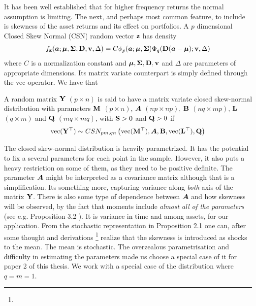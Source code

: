 \documentclass[]{book}\usepackage{knitr}
\begin{document}
It has been well established that for higher frequency returns the normal assumption is limiting. 
The next, and perhaps most common feature, to include is skewness of the asset returns and its effect on portfolios. 
A $p$ dimensional Closed Skew Normal (CSN) random vector $\mathbf{z}$ has density
\begin{equation}
  f_{\mathbf{z}}(\mbox{\boldmath$a$}; \mbox{\boldmath$\mu$}, \mathbf{\Sigma}, \mathbf{D}, \mathbf{v}, \Delta) = C \phi_p(\mbox{\boldmath$a$}; \mbox{\boldmath$\mu$}, \mathbf{\Sigma}) \Phi_q(\mathbf{D}(\mbox{\boldmath$a$}-\mbox{\boldmath$\mu$}); \mathbf{v}, \Delta)
\end{equation}
where $C$ is a normalization constant and $\mbox{\boldmath$\mu$}, \mathbf{\Sigma}, \mathbf{D}, \mathbf{v}$ and $\Delta$ are parameters of appropriate dimensions. Its matrix variate counterpart is simply defined through the vec operator. We have that
\begin{definition}
  A random matrix $\mathbf{Y}$ $(p \times n)$ is said to have a matrix variate closed skew-normal distribution with parameters $\mathbf{M}$ $(p \times n)$, $\mbox{\boldmath$A$}$ $(np \times np)$, $\mathbf{B}$ $(nq \times mp)$, $\mathbf{L}$ $(q \times m)$ and $\mathbf{Q}$ $(mq \times mq)$, with $\mathbf{S} > 0$ and $\mathbf{Q}>0$ if
  \begin{equation}
    \operatorname{vec}(\mathbf{Y}^\top) \sim CSN_{pm, qn}\left(\operatorname{vec}(\mathbf{M}^\top), \mbox{\boldmath$A$}, \mathbf{B}, \operatorname{vec}(\mathbf{L}^\top), \mathbf{Q}\right)
  \end{equation}
\end{definition} 
The closed skew-normal distribution is heavily parametrized. 
It has the potential to fix a several parameters for each point in the sample.
However, it also puts a heavy restriction on some of them, as they need to be positive definite.
The parameter $\mbox{\boldmath$A$}$ might be interpreted as a covariance matrix although that is a simplification.
Its something more, capturing variance along \textit{both} axis of the matrix $\mathbf{Y}$.
There is also some type of dependence between $\mbox{\boldmath$A$}$ and how skewness will be observed, by the fact that moments include \textit{almost all of the parameters} (see e.g. Proposition 3.2 \citet{dominguez2007matrix}).
It is variance in time and among assets, for our application.
From the stochastic representation in Proposition 2.1 \citet{dominguez2007matrix} one can, after some thought and derivations
\footnote{}
realize that the skewness is introduced as shocks to the mean.
The mean is stochastic. 
The overzealous parametrisation and difficulty in estimating the parameters made us choose a special case of it for paper 2 of this thesis.
We work with a special case of the distribution where $q=m=1$.
\end{document}
